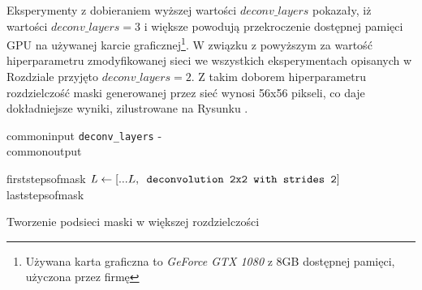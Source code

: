 Eksperymenty z dobieraniem wyższej wartości $deconv\_layers$ pokazały, iż wartości $deconv\_layers = 3$ i większe powodują przekroczenie dostępnej pamięci GPU na używanej karcie graficznej\footnote{Używana karta graficzna to \textit{GeForce GTX 1080} z 8GB dostępnej pamięci, użyczona przez firmę \blue{}}.
W związku z powyższym za wartość hiperparametru zmodyfikowanej sieci we wszystkich eksperymentach opisanych w Rozdziale  przyjęto $deconv\_layers = 2$. Z takim doborem hiperparametru rozdzielczość maski generowanej przez sieć wynosi 56x56 pikseli, co daje dokładniejsze wyniki, zilustrowane na Rysunku .

\vspace{0.5cm}

\begin{algorithm}
  {commoninput}
  \hspace*{\algorithmicindent} \verb|deconv_layers| - \deconvlayersdescription \\
  {commonoutput}
  \begin{algorithmic}[1]
    {firststepsofmask}
      \State $\mathit{L} \gets [...L,\verb| deconvolution 2x2 with strides 2|]$
    \EndFor
    {laststepsofmask}
	\end{algorithmic}
	\caption{Tworzenie podsieci maski w większej rozdzielczości}
	\label{alg:mask-r-cnn-modified}
\end{algorithm}
